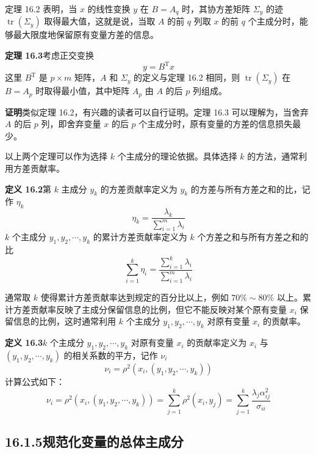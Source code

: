 \documentclass[UTF8,12pt,a4paper,fontset=fandol]{ctexart}
\begin{document}
定理 16.2 表明，当 $x$ 的线性变换 $y$ 在 $B=A_q$ 时，其协方差矩阵 $\Sigma_y$ 的迹 $\operatorname{tr}(\Sigma_y)$ 取得最大值，这就是说，当取 $A$ 的前 $q$ 列取 $x$ 的前 $q$ 个主成分时，能够最大限度地保留原有变量方差的信息。

\noindent\textbf{定理 16.3}\quad 考虑正交变换
\[
y=B^{\mathrm{T}}x
\]
这里 $B^{\mathrm{T}}$ 是 $p\times m$ 矩阵，$A$ 和 $\Sigma_y$ 的定义与定理 16.2 相同，则 $\operatorname{tr}(\Sigma_y)$ 在 $B=A_p$ 时取得最小值，其中矩阵 $A_p$ 由 $A$ 的后 $p$ 列组成。

\noindent\textbf{证明}\quad 类似定理 16.2，有兴趣的读者可以自行证明。定理 16.3 可以理解为，当舍弃 $A$ 的后 $p$ 列，即舍弃变量 $x$ 的后 $p$ 个主成分时，原有变量的方差的信息损失最少。

以上两个定理可以作为选择 $k$ 个主成分的理论依据。具体选择 $k$ 的方法，通常利用方差贡献率。

\noindent\textbf{定义 16.2}\quad 第 $k$ 主成分 $y_k$ 的方差贡献率定义为 $y_k$ 的方差与所有方差之和的比，记作 $\eta_k$
\begin{equation}
\eta_k=\frac{\lambda_k}{\displaystyle\sum_{i=1}^m\lambda_i}
\tag{16.30}
\end{equation}
$k$ 个主成分 $y_1,y_2,\cdots,y_k$ 的累计方差贡献率定义为 $k$ 个方差之和与所有方差之和的比
\begin{equation}
\sum_{i=1}^k\eta_i=
\frac{\displaystyle\sum_{i=1}^k\lambda_i}{\displaystyle\sum_{i=1}^m\lambda_i}
\tag{16.31}
\end{equation}

通常取 $k$ 使得累计方差贡献率达到规定的百分比以上，例如 $70\%\sim80\%$ 以上。累计方差贡献率反映了主成分保留信息的比例，但它不能反映对某个原有变量 $x_i$ 保留信息的比例，这时通常利用 $k$ 个主成分 $y_1,y_2,\cdots,y_k$ 对原有变量 $x_i$ 的贡献率。

\noindent\textbf{定义 16.3}\quad $k$ 个主成分 $y_1,y_2,\cdots,y_k$ 对原有变量 $x_i$ 的贡献率定义为 $x_i$ 与 $(y_1,y_2,\cdots,y_k)$ 的相关系数的平方，记作 $\nu_i$
\[
\nu_i=\rho^2(x_i,(y_1,y_2,\cdots,y_k))
\]
计算公式如下：
\begin{equation}
\nu_i=\rho^2(x_i,(y_1,y_2,\cdots,y_k))
=\sum_{j=1}^k\rho^2(x_i,y_j)
=\sum_{j=1}^k\frac{\lambda_j\alpha_{ij}^2}{\sigma_{ii}}
\tag{16.32}
\end{equation}

\subsection*{16.1.5\quad 规范化变量的总体主成分}
\end{document}
